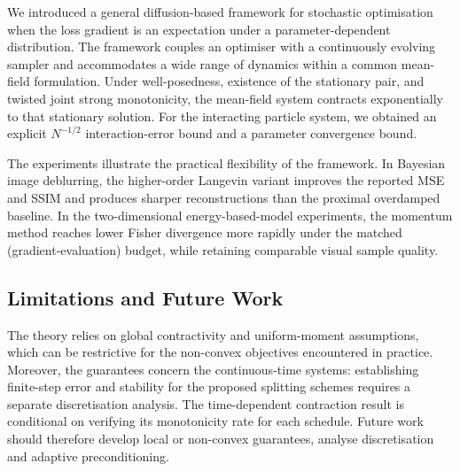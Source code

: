 We introduced a general diffusion-based framework for stochastic optimisation
when the loss gradient is an expectation under a parameter-dependent
distribution. The framework couples an optimiser with a continuously evolving
sampler and accommodates a wide range of dynamics within a common mean-field formulation. Under
well-posedness, existence of the stationary pair, and twisted joint strong
monotonicity, the mean-field system contracts exponentially to that stationary
solution. For the interacting particle system, we
obtained an explicit \(N^{-1/2}\) interaction-error bound and a parameter convergence bound.

The experiments illustrate the practical flexibility of the framework. In
Bayesian image deblurring, the higher-order Langevin variant improves the
reported MSE and SSIM and produces sharper reconstructions than the proximal
overdamped baseline. In the two-dimensional energy-based-model
experiments, the momentum method reaches lower Fisher divergence more rapidly
under the matched (gradient-evaluation) budget, while retaining
comparable visual sample quality.

\subsection{Limitations and Future Work}

The theory relies on global contractivity and uniform-moment assumptions, which
can be restrictive for the non-convex objectives encountered in practice. Moreover, the guarantees concern the continuous-time systems:
establishing finite-step error and stability for the proposed splitting schemes
requires a separate discretisation analysis. The time-dependent contraction
result is conditional on verifying its monotonicity rate for each schedule. Future work should therefore develop local or non-convex guarantees, analyse discretisation and adaptive preconditioning.
